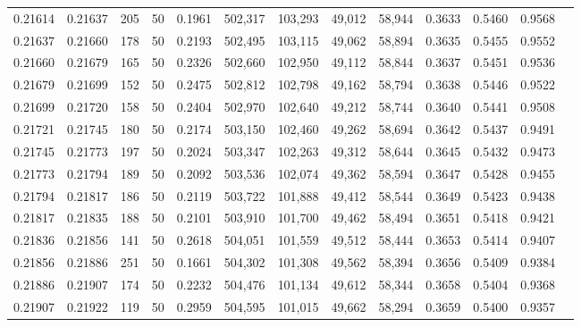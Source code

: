 \begin{tabular}{rrrrrrrrrrrrr}
0.21614 & 0.21637 &   205 &  50 &                                     0.1961 & 502,317 & 103,293 &  49,012 &  58,944 & 0.3633 & 0.5460 & 0.9568 \\
0.21637 & 0.21660 &   178 &  50 &                                     0.2193 & 502,495 & 103,115 &  49,062 &  58,894 & 0.3635 & 0.5455 & 0.9552 \\
0.21660 & 0.21679 &   165 &  50 &                                     0.2326 & 502,660 & 102,950 &  49,112 &  58,844 & 0.3637 & 0.5451 & 0.9536 \\
0.21679 & 0.21699 &   152 &  50 &                                     0.2475 & 502,812 & 102,798 &  49,162 &  58,794 & 0.3638 & 0.5446 & 0.9522 \\
0.21699 & 0.21720 &   158 &  50 &                                     0.2404 & 502,970 & 102,640 &  49,212 &  58,744 & 0.3640 & 0.5441 & 0.9508 \\
0.21721 & 0.21745 &   180 &  50 &                                     0.2174 & 503,150 & 102,460 &  49,262 &  58,694 & 0.3642 & 0.5437 & 0.9491 \\
0.21745 & 0.21773 &   197 &  50 &                                     0.2024 & 503,347 & 102,263 &  49,312 &  58,644 & 0.3645 & 0.5432 & 0.9473 \\
0.21773 & 0.21794 &   189 &  50 &                                     0.2092 & 503,536 & 102,074 &  49,362 &  58,594 & 0.3647 & 0.5428 & 0.9455 \\
0.21794 & 0.21817 &   186 &  50 &                                     0.2119 & 503,722 & 101,888 &  49,412 &  58,544 & 0.3649 & 0.5423 & 0.9438 \\
0.21817 & 0.21835 &   188 &  50 &                                     0.2101 & 503,910 & 101,700 &  49,462 &  58,494 & 0.3651 & 0.5418 & 0.9421 \\
0.21836 & 0.21856 &   141 &  50 &                                     0.2618 & 504,051 & 101,559 &  49,512 &  58,444 & 0.3653 & 0.5414 & 0.9407 \\
0.21856 & 0.21886 &   251 &  50 &                                     0.1661 & 504,302 & 101,308 &  49,562 &  58,394 & 0.3656 & 0.5409 & 0.9384 \\
0.21886 & 0.21907 &   174 &  50 &                                     0.2232 & 504,476 & 101,134 &  49,612 &  58,344 & 0.3658 & 0.5404 & 0.9368 \\
0.21907 & 0.21922 &   119 &  50 &                                     0.2959 & 504,595 & 101,015 &  49,662 &  58,294 & 0.3659 & 0.5400 & 0.9357 \\

\end{tabular}
